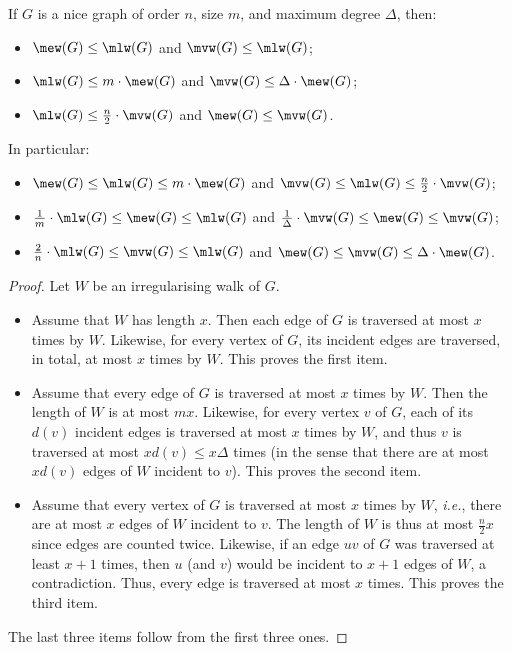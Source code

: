 \documentclass[a4paper,11pt,dvipsnames]{elsarticle}
\begin{document}
\begin{observation}\label{observation:relationships}
If $G$ is a nice graph of order $n$, size $m$, and maximum degree $\Delta$, then:
\begin{itemize}
    \item $\mew(G) \leq \mlw(G)$ and $\mvw(G) \leq \mlw(G)$;
    \item $\mlw(G) \leq m \cdot \mew(G)$ and $\mvw(G) \leq \Delta \cdot \mew(G)$;
    \item $\mlw(G) \leq \frac{n}{2} \cdot \mvw(G)$ and $\mew(G) \leq \mvw(G)$.
\end{itemize}
In particular: 
\begin{itemize}
    \item $\mew(G) \leq \mlw(G) \leq m \cdot \mew(G)$ and $\mvw(G) \leq \mlw(G) \leq \frac{n}{2} \cdot \mvw(G)$;
    
    \item $\frac{1}{m} \cdot \mlw(G) \leq \mew(G) \leq \mlw(G)$ and $\frac{1}{\Delta} \cdot \mvw(G) \leq \mew(G) \leq \mvw(G)$;
    
    \item $\frac{2}{n} \cdot \mlw(G) \leq \mvw(G) \leq \mlw(G)$ and $\mew(G) \leq \mvw(G) \leq \Delta \cdot \mew(G)$.
\end{itemize}
\end{observation}

\begin{proof}
Let $W$ be an irregularising walk of $G$.

\begin{itemize}
    \item Assume that $W$ has length $x$. Then each edge of $G$ is traversed at most $x$ times by $W$. Likewise, for every vertex of $G$, its incident edges are traversed, in total, at most $x$ times by $W$. This proves the first item.
    
    \item Assume that every edge of $G$ is traversed at most $x$ times by $W$. Then the length of $W$ is at most $mx$. Likewise, for every vertex $v$ of $G$, each of its $d(v)$ incident edges is traversed at most $x$ times by $W$, and thus $v$ is traversed at most $x d(v) \leq x \Delta$ times (in the sense that there are at most $xd(v)$ edges of $W$ incident to $v$). This proves the second item.
    
    \item Assume that every vertex of $G$ is traversed at most $x$ times by $W$, \textit{i.e.}, there are at most $x$ edges of $W$ incident to $v$. The length of $W$ is thus at most $\frac{n}{2}x$ since edges are counted twice. Likewise, if an edge $uv$ of $G$ was traversed at least $x+1$ times, then $u$ (and $v$) would be incident to $x+1$ edges of $W$, a contradiction. Thus, every edge is traversed at most $x$ times. This proves the third item.
\end{itemize}

The last three items follow from the first three ones.
\end{proof}
\end{document}
